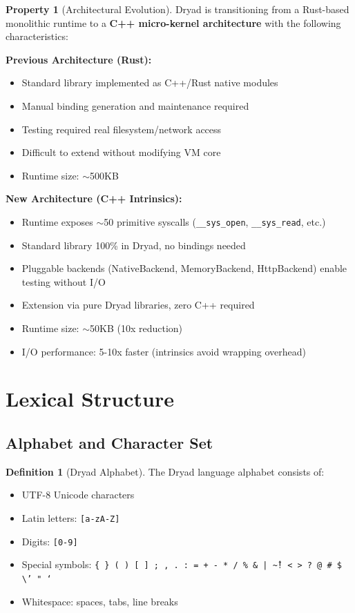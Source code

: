 \documentclass[12pt,a4paper]{article}
\theoremstyle{definition}
\newtheorem{definition}{Definition}[section]
\newtheorem{property}{Property}[section]
\begin{document}
\begin{property}[Architectural Evolution]
Dryad is transitioning from a Rust-based monolithic runtime to a \textbf{C++ micro-kernel architecture} with the following characteristics:

\textbf{Previous Architecture (Rust):}
\begin{itemize}[itemsep=2pt]
    \item Standard library implemented as C++/Rust native modules
    \item Manual binding generation and maintenance required
    \item Testing required real filesystem/network access
    \item Difficult to extend without modifying VM core
    \item Runtime size: $\sim$500KB
\end{itemize}

\textbf{New Architecture (C++ Intrinsics):}
\begin{itemize}[itemsep=2pt]
    \item Runtime exposes $\sim$50 primitive syscalls (\texttt{\_\_sys\_open}, \texttt{\_\_sys\_read}, etc.)
    \item Standard library 100\% in Dryad, no bindings needed
    \item Pluggable backends (NativeBackend, MemoryBackend, HttpBackend) enable testing without I/O
    \item Extension via pure Dryad libraries, zero C++ required
    \item Runtime size: $\sim$50KB (10x reduction)
    \item I/O performance: 5-10x faster (intrinsics avoid wrapping overhead)
\end{itemize}
\end{property}

\newpage

\section{Lexical Structure}

\subsection{Alphabet and Character Set}

\begin{definition}[Dryad Alphabet]
The Dryad language alphabet consists of:
\begin{itemize}[leftmargin=*, itemsep=3pt]
    \item UTF-8 Unicode characters
    \item Latin letters: \texttt{[a-zA-Z]}
    \item Digits: \texttt{[0-9]}
    \item Special symbols: \texttt{\{ \} ( ) [ ] ; , . : = + - * / \% \& | \^ \textasciitilde ! < > ? @ \# \$ \textbackslash ' " `}
    \item Whitespace: spaces, tabs, line breaks
\end{itemize}
\end{definition}
\end{document}
